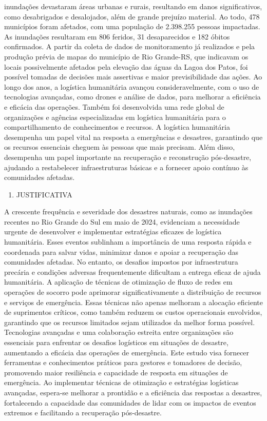 \documentclass[
]{article}
\providecommand{\tightlist}{%
  \setlength{\itemsep}{0pt}\setlength{\parskip}{0pt}}
\begin{document}
inundações devastaram áreas urbanas e rurais, resultando em danos
significativos, como desabrigados e desalojados, além de grande prejuízo
material. Ao todo, 478 municípios foram afetados, com uma população de
2.398.255 pessoas impactadas. As inundações resultaram em 806 feridos,
31 desaparecidos e 182 óbitos confirmados. A partir da coleta de dados
de monitoramento já realizados e pela produção prévia de mapas do
município de Rio Grande-RS, que indicavam os locais possivelmente
afetados pela elevação das águas da Lagoa dos Patos, foi possível
tomadas de decisões mais assertivas e maior previsibilidade das ações.
Ao longo dos anos, a logística humanitária avançou consideravelmente,
com o uso de tecnologias avançadas, como drones e análise de dados, para
melhorar a eficiência e eficácia das operações. Também foi desenvolvida
uma rede global de organizações e agências especializadas em logística
humanitária para o compartilhamento de conhecimentos e recursos. A
logística humanitária desempenha um papel vital na resposta a
emergências e desastres, garantindo que os recursos essenciais cheguem
às pessoas que mais precisam. Além disso, desempenha um papel importante
na recuperação e reconstrução pós-desastre, ajudando a restabelecer
infraestruturas básicas e a fornecer apoio contínuo às comunidades
afetadas.

\begin{enumerate}
\def\labelenumi{\arabic{enumi}.}
\setcounter{enumi}{1}
\tightlist
\item
  JUSTIFICATIVA
\end{enumerate}

A crescente frequência e severidade dos desastres naturais, como as
inundações recentes no Rio Grande do Sul em maio de 2024, evidenciam a
necessidade urgente de desenvolver e implementar estratégias eficazes de
logística humanitária. Esses eventos sublinham a importância de uma
resposta rápida e coordenada para salvar vidas, minimizar danos e apoiar
a recuperação das comunidades afetadas. No entanto, os desafios impostos
por infraestrutura precária e condições adversas frequentemente
dificultam a entrega eficaz de ajuda humanitária. A aplicação de
técnicas de otimização de fluxo de redes em operações de socorro pode
aprimorar significativamente a distribuição de recursos e serviços de
emergência. Essas técnicas não apenas melhoram a alocação eficiente de
suprimentos críticos, como também reduzem os custos operacionais
envolvidos, garantindo que os recursos limitados sejam utilizados da
melhor forma possível. Tecnologias avançadas e uma colaboração estreita
entre organizações são essenciais para enfrentar os desafios logísticos
em situações de desastre, aumentando a eficácia das operações de
emergência. Este estudo visa fornecer ferramentas e conhecimentos
práticos para gestores e tomadores de decisão, promovendo maior
resiliência e capacidade de resposta em situações de emergência. Ao
implementar técnicas de otimização e estratégias logísticas avançadas,
espera-se melhorar a prontidão e a eficiência das respostas a desastres,
fortalecendo a capacidade das comunidades de lidar com os impactos de
eventos extremos e facilitando a recuperação pós-desastre.
\end{document}
